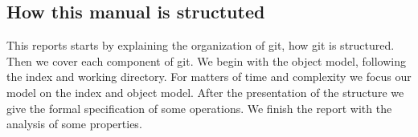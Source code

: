 \subsection{How this manual is structuted}
This reports starts by explaining the organization of git, how git is
structured. Then we cover each component of git. We begin with the
object model, following the index and working directory. For matters
of time and complexity we focus our model on the index and object
model. After the presentation of the structure we give the formal
specification of some operations. We finish the report with the
analysis of some properties.


